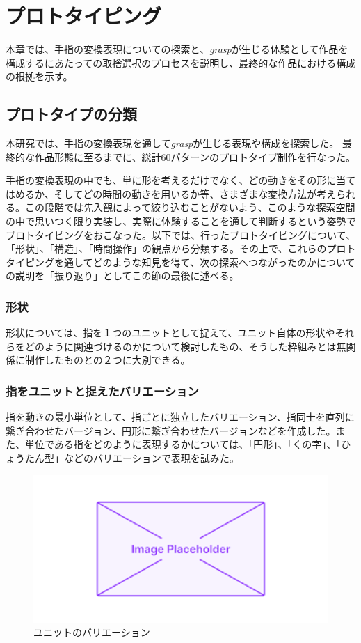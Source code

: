 \chapter{プロトタイピング}
\label{prototyping}
本章では、手指の変換表現についての探索と、\textit{grasp}が生じる体験として作品を構成するにあたっての取捨選択のプロセスを説明し、最終的な作品における構成の根拠を示す。

\section{プロトタイプの分類}
本研究では、手指の変換表現を通して\textit{grasp}が生じる表現や構成を探索した。
最終的な作品形態に至るまでに、総計60パターンのプロトタイプ制作を行なった。

手指の変換表現の中でも、単に形を考えるだけでなく、どの動きをその形に当てはめるか、そしてどの時間の動きを用いるか等、さまざまな変換方法が考えられる。この段階では先入観によって絞り込むことがないよう、このような探索空間の中で思いつく限り実装し、実際に体験することを通して判断するという姿勢でプロトタイピングをおこなった。以下では、行ったプロトタイピングについて、「形状」、「構造」、「時間操作」の観点から分類する。その上で、これらのプロトタイピングを通してどのような知見を得て、次の探索へつながったのかについての説明を「振り返り」としてこの節の最後に述べる。

\subsection{形状}
形状については、指を１つのユニットとして捉えて、ユニット自体の形状やそれらをどのように関連づけるのかについて検討したもの、そうした枠組みとは無関係に制作したものとの２つに大別できる。
\subsection*{指をユニットと捉えたバリエーション}
指を動きの最小単位として、指ごとに独立したバリエーション、指同士を直列に繋ぎ合わせたバージョン、円形に繋ぎ合わせたバージョンなどを作成した。また、単位である指をどのように表現するかについては、「円形」、「くの字」、「ひょうたん型」などのバリエーションで表現を試みた。
\begin{figure}[H]
  \centering
  \includegraphics[width=15cm]{img/placeholder.png}
  \caption{ユニットのバリエーション}
  \label{fig:unit_valiation}
\end{figure}

